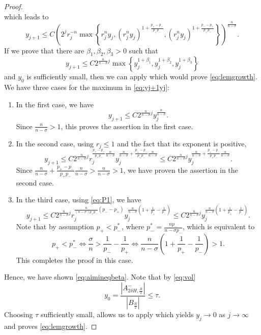 \documentclass[11pt]{amsart}
\theoremstyle{plain}
\theoremstyle{definition}
\numberwithin{equation}{section}
\begin{document}
\begin{proof}
\[\]
which leads to
\begin{equation}\label{eq:yj+1yj}
y_{j+1} \leq C \left( 2^j r_j^{-n}\max\left\{ r_j^n y_j, (r_j^{n}y_j)^{1+\frac{p_{+}-p_{-}}{p_{+}p_{-}}}, (r_j^{n}y_j)^{1+\frac{p_{-}-p_{+}}{p_{+}p_{-}}} \right\}\right)^{\frac{n}{n-\sigma}}. 
\end{equation} 
If we prove that there are $\beta_1, \beta_2,\beta_3 >0$ such that 
\begin{equation}\label{eq:aimineqbeta}
 y_{j+1} \leq C 2^{\frac{n}{n-\sigma}j} \max\left\{ y_j^{1+\beta_1},y_j^{1+\beta_2},y_j^{1+\beta_3}\right\}
\end{equation}
and $y_0$ is sufficiently small, then we can apply  which would prove \eqref{eq:lemgrowth}.
We have three cases for the maximum in \eqref{eq:yj+1yj}:
\begin{enumerate}
\item In the first case, we have
\[ y_{j+1} \leq C2^{\frac{n}{n-\sigma}j} y_{j}^{\frac{n}{n-\sigma}}. \]
Since $\frac{n}{n-\sigma}>1$, this proves the assertion in the first case.
\item In the second case, using $r_j\leq 1$ and the fact that its exponent is positive,
\[ y_{j+1} \leq C2^{\frac{n}{n-\sigma}j} r_j^{\frac{p_{+}-p_{-}}{p_{+}p_{-}}\frac{n}{n-\sigma}} y_{j}^{\frac{n}{n-\sigma} + \frac{p_{+}-p_{-}}{p_{+}p_{-}}\frac{n}{n-\sigma}} \leq C2^{\frac{n}{n-\sigma}j} y_{j}^{\frac{n}{n-\sigma} + \frac{p_{+}-p_{-}}{p_{+}p_{-}}\frac{n}{n-\sigma}}. \]
Since ${\frac{n}{n-\sigma} + \frac{p_{+}-p_{-}}{p_{+}p_{-}}\frac{n}{n-\sigma}} > {\frac{n}{n-\sigma}} >1$, we have proven the assertion in the second case.
\item In the third case, using \eqref{eq:P1}, we have
\[ y_{j+1} \leq C2^{\frac{n}{n-\sigma}j} r_j^{\frac{n}{(n-\sigma)p_{+}p_{-}}(p_{-}-p_{+})} y_{j}^{\frac{n}{n-\sigma}\left( 1 + \frac{1}{p_{+}} - \frac{1}{p_{-}}\right)} \leq  C2^{\frac{n}{n-\sigma}j} y_{j}^{\frac{n}{n-\sigma}\left( 1 + \frac{1}{p_{+}} - \frac{1}{p_{-}}\right)}.  \]
Note that by assumption $p_+ < p_-^\ast$, where $p_-^\ast = \frac{np_-}{n-\sigma p_-}$, which is equivalent to
\[ p_+ < p_-^\ast \iff \frac{\sigma}{n}>\frac{1}{p_{-}} - \frac{1}{p_{+}} \iff \frac{n}{n-\sigma}\left( 1 + \frac{1}{p_{+}} - \frac{1}{p_{-}}\right) >1. \]
This completes the proof in this case.
\end{enumerate}
Hence, we have shown \eqref{eq:aimineqbeta}. Note that by \eqref{eq:vol}
\[ y_0 = \frac{|A_{2\delta H, \frac{R}{2}}^{-}|}{|B_{\frac{R}{2}}|}\leq \tau. \]
Choosing $\tau$ sufficiently small, allows us to apply  which yields $y_j\to 0$ as $j\to\infty$ and proves
\eqref{eq:lemgrowth}.


\end{proof}
\end{document}
